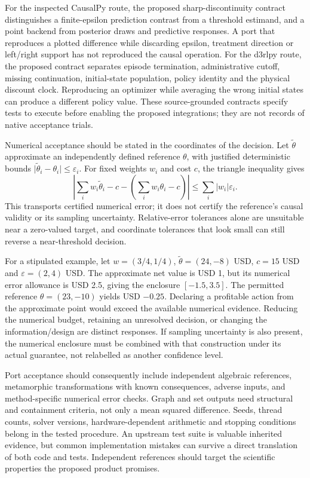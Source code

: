For the inspected CausalPy route, the proposed sharp-discontinuity contract
distinguishes a finite-epsilon prediction contrast from a threshold estimand,
and a point backend from posterior draws and predictive responses. A port that
reproduces a plotted difference while discarding epsilon, treatment direction
or left/right support has not reproduced the causal operation. For the d3rlpy
route, the proposed contract separates episode termination, administrative
cutoff, missing continuation, initial-state population, policy identity and
the physical discount clock. Reproducing an optimizer while averaging the
wrong initial states can produce a different policy value. These source-grounded
contracts specify tests to execute before enabling the proposed integrations;
they are not records of native acceptance trials.
\citep{exec14_causalpy_decision,exec15_d3rlpy_contract}

Numerical acceptance should be stated in the coordinates of the decision.
Let \(\widetilde\theta\) approximate an independently defined reference
\(\theta\), with justified deterministic bounds
\(\lvert\widetilde\theta_i-\theta_i\rvert\leq\varepsilon_i\). For fixed
weights \(w_i\) and cost \(c\), the triangle inequality gives
\[
 \left|\sum_iw_i\widetilde\theta_i-c-
              \left(\sum_iw_i\theta_i-c\right)\right|
 \leq\sum_i|w_i|\varepsilon_i.
\]
This transports certified numerical error; it does not certify the reference's
causal validity or its sampling uncertainty. Relative-error tolerances alone
are unsuitable near a zero-valued target, and coordinate tolerances that look
small can still reverse a near-threshold decision.

For a stipulated example, let \(w=(3/4,1/4)\),
\(\widetilde\theta=(24,-8)\) USD, \(c=15\) USD and
\(\varepsilon=(2,4)\) USD. The approximate net value is USD 1, but its
numerical error allowance is USD 2.5, giving the enclosure
\([-1.5,3.5]\). The permitted reference \(\theta=(23,-10)\) yields USD
\(-0.25\). Declaring a profitable action from the approximate point would
exceed the available numerical evidence. Reducing the numerical budget,
retaining an unresolved decision, or changing the information/design are
distinct responses. If sampling uncertainty is also present, the numerical
enclosure must be combined with that construction under its actual guarantee,
not relabelled as another confidence level.
\citep{exec16_s10_exact}

Port acceptance should consequently include independent algebraic references,
metamorphic transformations with known consequences, adverse inputs, and
method-specific numerical error checks. Graph and set outputs need structural
and containment criteria, not only a mean squared difference. Seeds, thread
counts, solver versions, hardware-dependent arithmetic and stopping conditions
belong in the tested procedure. An upstream test suite is valuable inherited
evidence, but common implementation mistakes can survive a direct translation
of both code and tests. Independent references should target the scientific
properties the proposed product promises.

